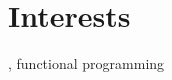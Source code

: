 \documentclass[10pt]{article}
\begin{document}
\makeatletter
\renewcommand{\@bibunitname}{\jobname.\the\@bibunitauxcnt}
\makeatother

\begin{bibunit}
  \renewcommand\refname{Selected Publications and Presentations}
  \let\originalbibitem\bibitem
  \def\bibitem#1#2\par{%
    \noexpandarg
    \originalbibitem{#1}
    \par}
  {\footnotesize \putbib[cv]}
\end{bibunit}

\section{Interests}
\interests{}, functional programming

\footerResume

\pagestyle{myheadings}

\end{document}
